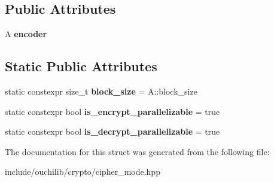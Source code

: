 \subsection*{Public Attributes}
\begin{DoxyCompactItemize}
\item 
\mbox{\label{structouchi_1_1crypto_1_1ecb_aeddb893beb52b9872c64fc977b75a27a}} 
A {\bfseries encoder}
\end{DoxyCompactItemize}
\subsection*{Static Public Attributes}
\begin{DoxyCompactItemize}
\item 
\mbox{\label{structouchi_1_1crypto_1_1ecb_afdf8d2ea1f0f1415b3eeafbc8ca7f6e4}} 
static constexpr size\+\_\+t {\bfseries block\+\_\+size} = A\+::block\+\_\+size
\item 
\mbox{\label{structouchi_1_1crypto_1_1ecb_acf762d1da49d9c767c9e891f85bf400c}} 
static constexpr bool {\bfseries is\+\_\+encrypt\+\_\+parallelizable} = true
\item 
\mbox{\label{structouchi_1_1crypto_1_1ecb_a179ba5200f6c0bbcae9082bd92d8766f}} 
static constexpr bool {\bfseries is\+\_\+decrypt\+\_\+parallelizable} = true
\end{DoxyCompactItemize}


The documentation for this struct was generated from the following file\+:\begin{DoxyCompactItemize}
\item 
include/ouchilib/crypto/cipher\+\_\+mode.\+hpp\end{DoxyCompactItemize}
